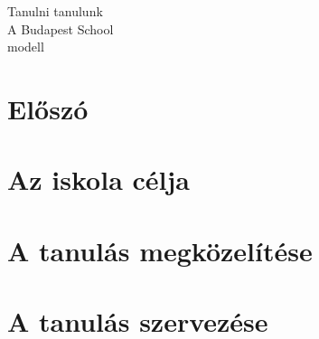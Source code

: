 \documentclass[10pt,openright,twoside]{book}
\newcommand{\chaptercover}[1]{
    \cleardoublepage
    
}
\begin{document}
\newif\ifkerettanterv
\kerettantervtrue

\frontmatter
\begin{titlepage} %

	\centering %
	
	\scshape %
	
  \vspace*{\baselineskip} %
  {\Large Tanulni tanulunk}\\
  A Budapest School\\
    modell
\end{titlepage}





\tableofcontents

\chapter{Előszó}



\mainmatter


\chaptercover{pics/chapter_covers/1e.jpg}
\chapter{Az iskola célja}



\label{sec:alapelvek}



\chaptercover{pics/chapter_covers/2e.jpg}
\chapter{A tanulás megközelítése}





\chaptercover{pics/chapter_covers/3e.jpg}

\chapter{A tanulás szervezése}

\end{document}
